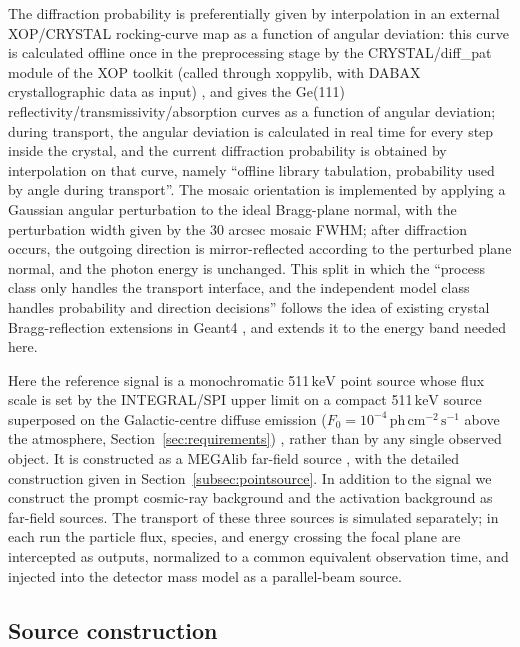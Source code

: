 \documentclass[11pt]{article}
\newcommand{\keV}{\ensuremath{\,\mathrm{keV}}}
\newcommand{\phcms}{\ensuremath{\,\mathrm{ph\,cm^{-2}\,s^{-1}}}}
\newcommand{\fzero}{F_{0}}
\begin{document}
The diffraction probability is preferentially given by interpolation in an external XOP/CRYSTAL rocking-curve map as a function of angular deviation: this curve is calculated offline once in the preprocessing stage by the CRYSTAL/diff\_pat module of the XOP toolkit (called through xoppylib, with DABAX crystallographic data as input) \cite{SanchezDelRio2011XOP}, and gives the Ge(111) reflectivity/transmissivity/absorption curves as a function of angular deviation; during transport, the angular deviation is calculated in real time for every step inside the crystal, and the current diffraction probability is obtained by interpolation on that curve, namely ``offline library tabulation, probability used by angle during transport''. The mosaic orientation is implemented by applying a Gaussian angular perturbation to the ideal Bragg-plane normal, with the perturbation width given by the 30 arcsec mosaic FWHM; after diffraction occurs, the outgoing direction is mirror-reflected according to the perturbed plane normal, and the photon energy is unchanged. This split in which the ``process class only handles the transport interface, and the independent model class handles probability and direction decisions'' follows the idea of existing crystal Bragg-reflection extensions in Geant4 \cite{Guan2023BraggReflection,Reiazi2025G4BraggReflection}, and extends it to the energy band needed here.

Here the reference signal is a monochromatic 511\keV{} point source whose flux scale is set by the INTEGRAL/SPI upper limit on a compact 511\keV{} source superposed on the Galactic-centre diffuse emission ($\fzero=10^{-4}\phcms$ above the atmosphere, Section~\ref{sec:requirements}) \cite{Siegert2016AA,DeCesare2011}, rather than by any single observed object. It is constructed as a MEGAlib far-field source \cite{Zoglauer2006}, with the detailed construction given in Section~\ref{subsec:pointsource}. In addition to the signal we construct the prompt cosmic-ray background and the activation background as far-field sources. The transport of these three sources is simulated separately; in each run the particle flux, species, and energy crossing the focal plane are intercepted as outputs, normalized to a common equivalent observation time, and injected into the detector mass model as a parallel-beam source.

\subsection{Source construction}
\label{sec:background}
\end{document}
